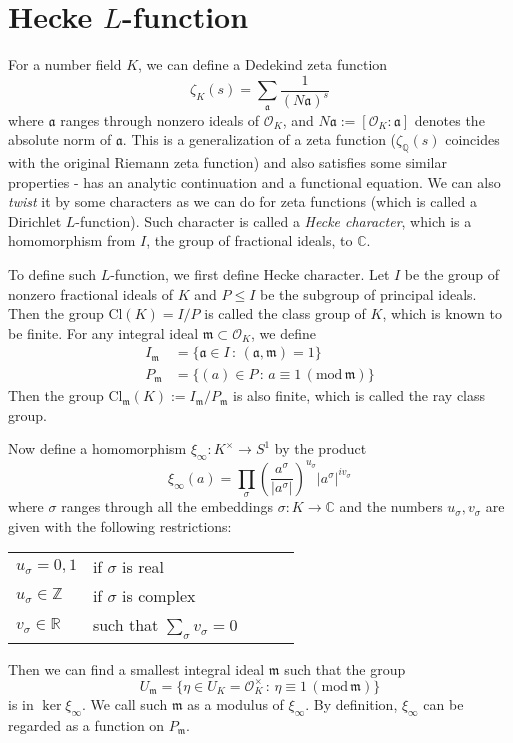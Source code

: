 \documentclass{article}
\newcommand{\Cl}{\mathrm{Cl}}
\newcommand{\Mod}[1]{\,(\mathrm{mod}\,#1)}
\begin{document}
\section{Hecke $L$-function}
For a number field $K$, we can define a Dedekind zeta function
$$
\zeta_{K}(s) = \sum_{\mathfrak{a}} \frac{1}{(N\mathfrak{a})^{s}}
$$
where $\mathfrak{a}$ ranges through nonzero ideals of $\mathcal{O}_{K}$, and $N\mathfrak{a}:=[\mathcal{O}_{K}:\mathfrak{a}]$ denotes the absolute norm of $\mathfrak{a}$. 
This is a generalization of a zeta function ($\zeta_{\mathbb{Q}}(s)$ coincides with the original Riemann zeta function) and also satisfies some similar properties - has an analytic continuation and a functional equation. 
We can also \emph{twist} it by some characters as we can do for zeta functions (which is called a Dirichlet $L$-function). Such character is called a \emph{Hecke character}, which is a homomorphism from $I$, the group of fractional ideals, to $\mathbb{C}$. 

To define such $L$-function, we first define Hecke character. Let $I$ be the group of nonzero fractional ideals of $K$ and $P\leq I$ be the subgroup of principal ideals. Then the group $\Cl(K) = I/P$ is called the class group of $K$, which is known to be finite. 
For any integral ideal $\mathfrak{m}\subset \mathcal{O}_{K}$, we define 
\begin{align*}
I_{\mathfrak{m}} &= \{ \mathfrak{a}\in I\,:\, (\mathfrak{a}, \mathfrak{m}) = 1\} \\
P_{\mathfrak{m}} &= \{(a)\in P\,:\, a\equiv 1\Mod{\mathfrak{m}}\}
\end{align*}
Then the group $\Cl_{\mathfrak{m}}(K):= I_{\mathfrak{m}}/P_{\mathfrak{m}}$ is also finite, which is called the ray class group. 

Now define a homomorphism $\xi_{\infty}:K^{\times}\to S^{1}$ by the product 
$$
\xi_{\infty}(a) = \prod_{\sigma} \left(\frac{a^{\sigma}}{|a^{\sigma}|}\right)^{u_{\sigma}}|a^{\sigma}|^{iv_{\sigma}}
$$
where  $\sigma$ ranges through all the embeddings $\sigma:K\to \mathbb{C}$ and the numbers $u_{\sigma}, v_{\sigma}$ are given with the following restrictions:
\begin{center}
\begin{tabular}{lllll}
$u_{\sigma} = 0, 1$        & if $\sigma$ is real                     &  &  &  \\
$u_{\sigma}\in \mathbb{Z}$ & if $\sigma$ is complex                  &  &  &  \\
$v_{\sigma}\in \mathbb{R}$ & such that $\sum_{\sigma}v_{\sigma} = 0$ &  &  & 
\end{tabular}
\end{center}
Then we can find a smallest integral ideal $\mathfrak{m}$ such that the group 
$$
U_{\mathfrak{m}} = \{\eta \in U_{K}=\mathcal{O}_{K}^{\times}\,:\,\eta\equiv 1\Mod{\mathfrak{m}}\}
$$
is in $\ker \xi_{\infty}$. We call such $\mathfrak{m}$ as a modulus of $\xi_{\infty}$. By definition, $\xi_{\infty}$ can be regarded as a function on $P_{\mathfrak{m}}$. 
\end{document}
